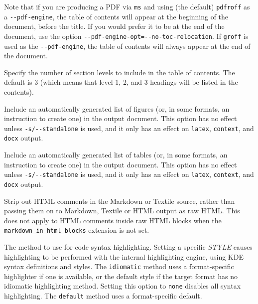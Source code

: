 \documentclass[
]{article}
\begin{document}
\begin{description}
Note that if you are producing a PDF via \texttt{ms} and using (the
default) \texttt{pdfroff} as a \texttt{-\/-pdf-engine}, the table of
contents will appear at the beginning of the document, before the title.
If you would prefer it to be at the end of the document, use the option
\texttt{-\/-pdf-engine-opt=-\/-no-toc-relocation}. If \texttt{groff} is
used as the \texttt{-\/-pdf-engine}, the table of contents will always
appear at the end of the document.
\item[\texttt{-\/-toc-depth=}\emph{NUMBER}]
Specify the number of section levels to include in the table of
contents. The default is 3 (which means that level-1, 2, and 3 headings
will be listed in the contents).
\item[\texttt{-\/-lof{[}=true\textbar{}false{]}},
\texttt{-\/-list-of-figures{[}=true\textbar{}false{]}}]
Include an automatically generated list of figures (or, in some formats,
an instruction to create one) in the output document. This option has no
effect unless \texttt{-s/-\/-standalone} is used, and it only has an
effect on \texttt{latex}, \texttt{context}, and \texttt{docx} output.
\item[\texttt{-\/-lot{[}=true\textbar{}false{]}},
\texttt{-\/-list-of-tables{[}=true\textbar{}false{]}}]
Include an automatically generated list of tables (or, in some formats,
an instruction to create one) in the output document. This option has no
effect unless \texttt{-s/-\/-standalone} is used, and it only has an
effect on \texttt{latex}, \texttt{context}, and \texttt{docx} output.
\item[\texttt{-\/-strip-comments{[}=true\textbar{}false{]}}]
Strip out HTML comments in the Markdown or Textile source, rather than
passing them on to Markdown, Textile or HTML output as raw HTML. This
does not apply to HTML comments inside raw HTML blocks when the
\texttt{markdown\_in\_html\_blocks} extension is not set.
\item[\texttt{-\/-syntax-highlighting=default\textbar{}none\textbar{}idiomatic\textbar{}}\emph{STYLE}\texttt{\textbar{}}\emph{FILE}]
The method to use for code syntax highlighting. Setting a specific
\emph{STYLE} causes highlighting to be performed with the internal
highlighting engine, using KDE syntax definitions and styles. The
\texttt{idiomatic} method uses a format-specific highlighter if one is
available, or the default style if the target format has no idiomatic
highlighting method. Setting this option to \texttt{none} disables all
syntax highlighting. The \texttt{default} method uses a format-specific
default.


\end{description}
\end{document}

